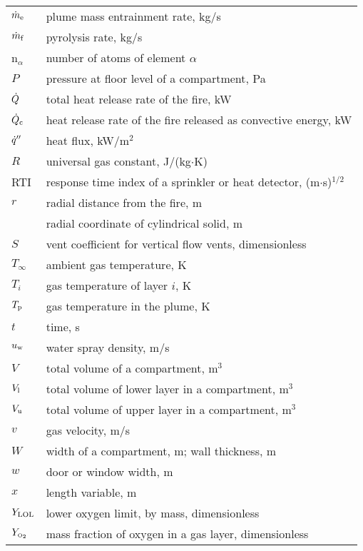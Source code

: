 \documentclass[12pt]{book}
\begin{document}
\begin{center}
\begin{longtable}{p{1in}  p{5.5 in}}
$\dot{m}_{\rm e}$              & plume mass entrainment rate, kg/s \\
$\dot{m}_{\rm f}$              & pyrolysis rate, kg/s \\
n$_\alpha$          & number of atoms of element $\alpha$ \\
$P$                 & pressure at floor level of a compartment, Pa \\
$\dot{Q}$               & total heat release rate of the fire, kW \\
$\dot{Q}_{\rm c}$              & heat release rate of the fire released as convective energy, kW \\
$\dot{q}''$             & heat flux, kW/m$^2$ \\
$R$                 & universal gas constant, J/(kg$\cdot$K) \\
RTI                 & response time index of a sprinkler or heat detector, (m$\cdot$s)$^{1/2}$ \\
$r$                 & radial distance from the fire, m \\
                    & radial coordinate of cylindrical solid, m \\
$S$                 & vent coefficient for vertical flow vents, dimensionless \\
$T_\infty$          & ambient gas temperature, K \\
$T_i$               & gas temperature of layer $i$, K \\
$T_{\rm p}$               & gas temperature in the plume, K \\
$t$                 & time, s \\
$u_{\rm w}$         & water spray density, m/s \\
$V$                 & total volume of a compartment, m$^3$ \\
$V_{\rm l}$               & total volume of lower layer in a compartment, m$^3$ \\
$V_{\rm u}$               & total volume of upper layer in a compartment, m$^3$ \\
$v$                 & gas velocity, m/s \\
$W$                 & width of a compartment, m; wall thickness, m \\
$w$                 & door or window width, m \\
$x$                 & length variable, m \\
$Y_{\rm LOL}$       & lower oxygen limit, by mass, dimensionless \\
$Y_{\tiny \hbox{O}_2}$           & mass fraction of oxygen in a gas layer, dimensionless \\

\end{longtable}
\end{center}
\end{document}

